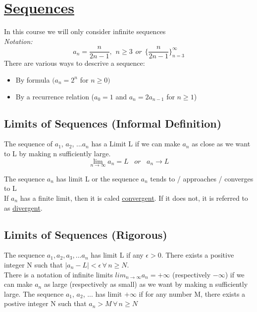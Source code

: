 \documentclass[12pt, letterpaper]{article}
\begin{document}
    \section{\underline{Sequences}}
        In this course we will only consider infinite sequences\\
        \textit{Notation:}
            \begin{equation*}
                a_n = \frac{n}{2n-1},\hspace{5pt} n \geqslant 3 \hspace{5pt} or \hspace{5pt} \bigg\{ \frac{n}{2n-1} \bigg\} ^\infty _{n=3}
            \end{equation*}
        There are various ways to descrive a sequence:
        \begin{center}
            \begin{itemize}
                \item By formula $(a_n = 2^n$ for $n \geqslant 0)$
                \item By a recurrence relation ($a_0 = 1$ and $a_n = 2a_{n-1}$ for $n \geqslant 1$)
            \end{itemize}
        \end{center}
        
        \subsection*{Limits of Sequences (Informal Definition)}
            The sequence of $a_1$, $a_2$, ...$a_n$ has a Limit L if we can make $a_n$ as close as we want to L by making n sufficiently large. 
            \begin{equation*}
                \lim_{n \to \infty} a_n = L \hspace{10pt} or \hspace{10pt} a_n \to L
            \end{equation*}

            The sequence $a_n$ has limit L or the sequence $a_n$ tends to / approaches / converges to L\\
            If $a_n$ has a finite limit, then it is caled \underline{convergent}. If it does not, it is referred to as \underline{divergent}.
        
        \subsection*{Limits of Sequences (Rigorous)}
            The sequence $a_1 , a_2 , a_3 , ... a_n$ has limit L if any $\epsilon > 0$. There exists a positive integer N such that $|a_n - L| < \epsilon \, \forall \, n \geqslant N$.\\
            There is a notation of infinite limits $lim_{n \to \infty} a_n = +\infty$ (respectively $-\infty$) if we can make $a_n$ as large (respectively as small) as we want by making n sufficiently large. 
            The sequence $a_1$, $a_2$, ... has limit $+\infty$ if for any number M, there exists a postive integer N such that $a_n > M \, \forall \, n \geqslant N$
            
\end{document}

